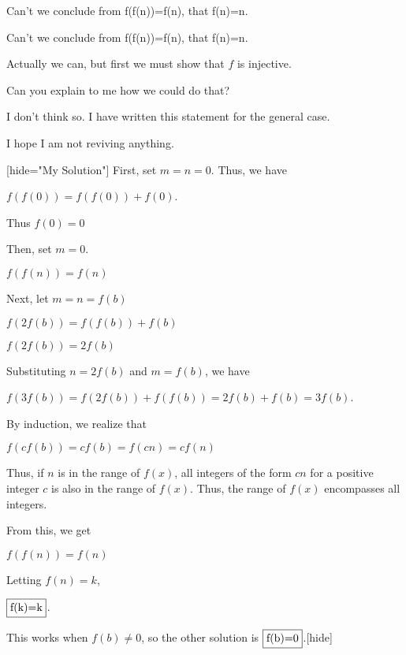 \begin{solution}
	Can't we conclude from f(f(n))=f(n), that f(n)=n.
\end{solution}



\begin{solution}
	\begin{tcolorbox}Can't we conclude from f(f(n))=f(n), that f(n)=n.\end{tcolorbox}
Actually we can, but first we must show that $f$ is injective.
\end{solution}



\begin{solution}
	Can you explain to me how we could do that?
\end{solution}



\begin{solution}
	I don't think so. I have written this statement for the general case.
\end{solution}



\begin{solution}
	I hope I am not reviving anything.

[hide="My Solution"]
First, set $m=n=0$. Thus, we have

$f(f(0))=f(f(0))+f(0)$. 

Thus $f(0)=0$

Then, set $m=0$. 

$f(f(n))=f(n)$

Next, let $m=n=f(b)$

$f(2f(b))=f(f(b))+f(b)$

$f(2f(b))=2f(b)$

Substituting $n=2f(b)$ and $m=f(b)$, we have

$f(3f(b))=f(2f(b))+f(f(b))=2f(b)+f(b)=3f(b)$.

By induction, we realize that 

$f(cf(b))=cf(b)=f(cn)=cf(n)$

Thus, if $n$ is in the range of $f(x)$, all integers of the form $cn$ for a positive integer $c$ is also in the range of $f(x)$. Thus, the range of $f(x)$ encompasses all integers.

From this, we get 

$f(f(n))=f(n)$

Letting $f(n)=k$,

$\fbox{f(k)=k}$.

This works when $f(b)\neq 0$, so the other solution is $\fbox{f(b)=0}$.[\/hide]
\end{solution}



